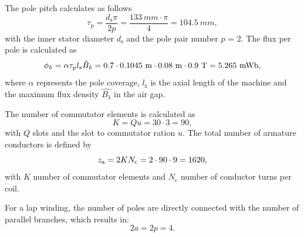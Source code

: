 
\begin{solutionblock}
	The pole pitch calculates as follows
	\begin{equation}
		\tau_{\mathrm{p}} = \frac{d_{\mathrm{s}} \pi}{2 p}
		= \frac{133 \ \si{mm} \cdot \pi}{4}
		= 104.5 \ \si{mm},
	\end{equation}
	with the inner stator diameter $d_{\mathrm{s}}$ and the pole pair number $p$ = 2.
	The flux per pole is calculated as
	\begin{equation}
		\phiDelta = \alpha \tau_{\mathrm{p}} \lz \hat{B}_{\updelta}
		= 0.7 \cdot 0.1045 \ \si{m} \cdot 0.08 \ \si{m} \cdot 0.9 \ \si{T}
		= 5.265 \ \si{mWb},
	\end{equation}
	where $\alpha$ represents the pole coverage, $l_{\mathrm{z}}$ is the axial length of the machine and the maximum flux density $\hat{B_{\updelta}}$ in the air gap.

\end{solutionblock}


\begin{solutionblock}
	The number of commutator elements is calculated as
	\begin{equation}
		K = Q u
		= 30 \cdot 3
		= 90,
	\end{equation}
	with $Q$ slots and the slot to commutator ration $u$.
	The total number of armature conductors is defined by
	\begin{equation}
		z_{\mathrm{a}} = 2 K N_{\mathrm{c}}
		= 2 \cdot 90 \cdot 9
		= 1620,
	\end{equation}
	with $K$ number of commutator elements and $N_{\mathrm{c}}$ number of conductor turns per coil.

	For a lap winding, the number of poles are directly connected with the number of parallel branches, which results in:
	\begin{equation}
		2a = 2p = 4.
	\end{equation}
\end{solutionblock}


